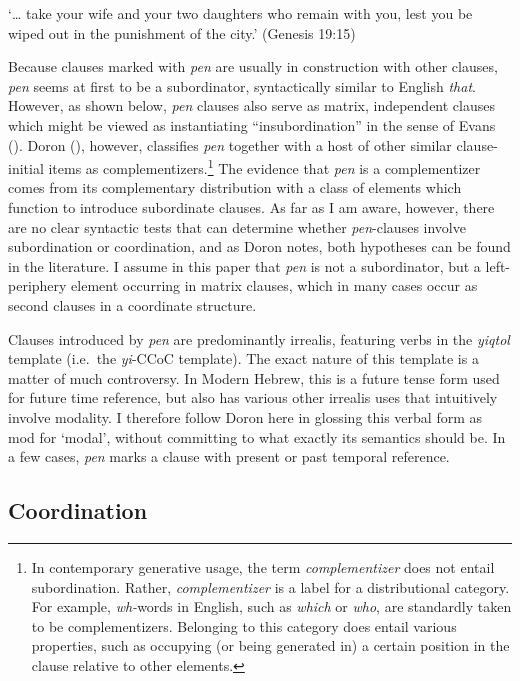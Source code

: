 \documentclass[output=paper,colorlinks,citecolor=brown]{langscibook}
\begin{document}
\glt  `{\ldots} take your wife and your two daughters who remain with you, lest you be wiped out in the punishment of the city.' (Genesis 19:15)
\z

 Because clauses marked with \textit{pen} are usually in construction with other clauses, \textit{pen} seems at first to be a subordinator, syntactically similar to English \textit{that}. However, as shown below, \textit{pen} clauses also serve as matrix, independent clauses which might be viewed as instantiating ``insubordination'' in the sense of Evans (\citeyear{evans2007}). Doron (\citeyear{doron19}), however, classifies \textit{pen} together with a host of other similar clause-initial items as complementizers.\footnote{In contemporary generative usage, the term \textit{complementizer} does not entail subordination. Rather, \textit{complementizer} is a label for a distributional category. For example, \textit{wh-}words in English, such as \textit{which} or \textit{who}, are standardly taken to be complementizers. Belonging to this category does entail various properties, such as occupying (or being generated in) a certain position in the clause relative to other elements.} The evidence that \textit{pen} is a complementizer comes from its complementary distribution with a  class of elements which function to introduce subordinate clauses. As far as I am aware, however, there are no clear syntactic tests that can determine whether \textit{pen}-clauses involve subordination or coordination, and as Doron notes, both hypotheses can be found in the literature. I assume in this paper that \textit{pen} is not a subordinator, but a left-periphery element occurring in  matrix clauses, which in many cases occur as second clauses in a coordinate structure.  

Clauses introduced by \textit{pen} are predominantly irrealis, featuring verbs in the \textit{yiqtol} template (i.e.\ the \textit{yi}-CCoC template). The exact nature of this template is a matter of much controversy. In Modern Hebrew, this is a future tense form used for future time reference, but also has various other irrealis uses that intuitively involve modality. I therefore follow Doron here in glossing this verbal form as {\sc mod} for `modal', without committing to what exactly its semantics should be. In a few cases, \textit{pen} marks a clause with  present or past temporal reference. 

\subsection{Coordination}
\label{subsec:coordination}
\end{document}
